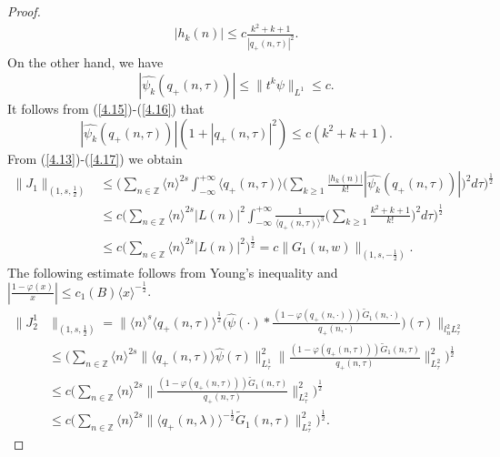 \documentclass[reqno]{amsart}
\numberwithin{equation}{section}
\begin{document}
\begin{proof}
\begin{align}\label{4.15b}
|h_{k}(n)| \leq c\frac{k^{2}+k+1}{| q_{+}(n,\tau)|^{2}}.
\end{align}
On the other hand, we have
\begin{equation}\label{4.16}
| \widehat{\psi_{k}}(q_{+}(n,\tau))|
\leq\|t^{k}\psi\| _{L^{1}}\leq c.
\end{equation}
It follows from (\ref{4.15})-(\ref{4.16}) that
\begin{equation}\label{4.17}
| \widehat{\psi_{k}}(q_{+}(n,\tau))|(1+|  q_{+}(n,\tau)|^{2}) \leq c(k^{2}+k+1)\text{.}
\end{equation}
From (\ref{4.13})-(\ref{4.17}) we obtain
\begin{equation}\label{4.18}
\begin{split}
\| J_{1}\| _{(1,s,\frac12)}
&\leq\Big(\sum_{n\in\mathbb{Z}}\langle n\rangle^{2s}\int_{-\infty}^{+\infty}
\langle q_{+}(n,\tau)\rangle\Big(\sum\limits_{k\geq1}\frac{|h_{k}(n)| }{k!}
|\widehat{\psi_{k}}(q_{+}(n,\tau))|\Big)^{2}d\tau\Big)^{\frac{1}{2}}\\
& \leq c\Big(  \sum_{n\in\mathbb{Z}}\langle n\rangle^{2s}
|L(n)| ^{2}\int_{-\infty}^{+\infty}\frac{1}{\langle q_{+}(n,\tau)\rangle^{3}}
\Big(\sum\limits_{k\geq1}\frac{k^{2}+k+1}{k!}\Big)^{2}d\tau\Big)^{\frac{1}{2}}\\
& \leq c\Big(\sum_{n\in\mathbb{Z}}\langle
n\rangle^{2s}|L(n)|^{2}\Big)^{\frac{1}{2}} =c\|G_{1}(u,w)\|
_{(1,s,-\frac12)}.
\end{split}
\end{equation}
The following estimate follows from Young's inequality and
$|\frac{1-\varphi(x)}{x}| \leq c_{1}(B)\langle
x\rangle^{-\frac12}$.
\begin{equation}\label{4.19}
\begin{split}
\|J_{2}^{1}&\|_{(1,s,\frac12)} =\| \langle n\rangle^{s}\langle
q_{+}(n,\tau)\rangle^{\frac{1}{2}}
\Big(\widehat{\psi}(\cdot)\ast\frac{(1-\varphi(q_{+}(n,\cdot )))
\widetilde{G}_{1}(n,\cdot)}{q_{+}(n,\cdot)}\Big)  (\tau
)\| _{l_{n}^{2}L_{\tau}^{2}}\\
&\leq\Big(  \sum_{n\in\mathbb{Z}}\langle n\rangle^{2s} \|\langle
q_{+}(n,\tau)\rangle\widehat{\psi}(\tau)\| _{L_{\tau}^{1}}^{2}
\|\frac{\left(1-\varphi(q_{+}(n,\tau))\right) \widetilde
{G}_{1}(n,\tau)}{q_{+}(n,\tau)}\|
_{L_{\tau}^{2}}^{2}\Big)^{\frac{1}{2}}\\
&\leq c\Big(  \sum_{n\in\mathbb{Z}}\langle n\rangle^{2s}\|
\frac{\left( 1-\varphi(q_{+}(n,\tau))\right)
\widetilde{G}_{1}(n,\tau
)}{q_{+}(n,\tau)}\| _{L_{\tau}^{2}}^{2}\Big)^{\frac12}\\
&\leq c\Big(\sum_{n\in\mathbb{Z}}\langle n\rangle^{2s} \|\langle
q_{+}(n,\lambda)\rangle^{-\frac{1}{2}}\widetilde{G}_{1}(n,\tau)
\|_{L_{\tau}^2}^2\Big)^{\frac12}.
\end{split}
\end{equation}


\end{proof}
\end{document}
